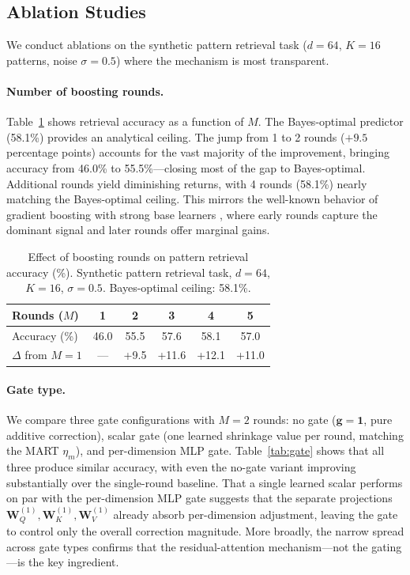 \documentclass{article}
\theoremstyle{definition}
\begin{document}
\subsection{Ablation Studies}
\label{sec:ablations}

We conduct ablations on the synthetic pattern retrieval task ($d = 64$, $K = 16$ patterns, noise $\sigma = 0.5$) where the mechanism is most transparent.

\paragraph{Number of boosting rounds.}
Table~\ref{tab:rounds} shows retrieval accuracy as a function of $M$.
The Bayes-optimal predictor (58.1\%) provides an analytical ceiling.
The jump from 1 to 2 rounds ($+9.5$ percentage points) accounts for the vast majority of the improvement, bringing accuracy from 46.0\% to 55.5\%---closing most of the gap to Bayes-optimal.
Additional rounds yield diminishing returns, with 4 rounds (58.1\%) nearly matching the Bayes-optimal ceiling.
This mirrors the well-known behavior of gradient boosting with strong base learners \citep{friedman2001greedy}, where early rounds capture the dominant signal and later rounds offer marginal gains.

\begin{table}[t]
\centering
\caption{Effect of boosting rounds on pattern retrieval accuracy (\%). Synthetic pattern retrieval task, $d=64$, $K=16$, $\sigma=0.5$. Bayes-optimal ceiling: 58.1\%.}
\label{tab:rounds}
\begin{tabular}{@{}lccccc@{}}
\toprule
\textbf{Rounds ($M$)} & 1 & 2 & 3 & 4 & 5 \\
\midrule
Accuracy (\%) & 46.0 & 55.5 & 57.6 & 58.1 & 57.0 \\
$\Delta$ from $M{=}1$ & --- & +9.5 & +11.6 & +12.1 & +11.0 \\
\bottomrule
\end{tabular}
\end{table}

\paragraph{Gate type.}
We compare three gate configurations with $M{=}2$ rounds: no gate ($\mathbf{g} = \mathbf{1}$, pure additive correction), scalar gate (one learned shrinkage value per round, matching the MART $\eta_m$), and per-dimension MLP gate.
Table~\ref{tab:gate} shows that all three produce similar accuracy, with even the no-gate variant improving substantially over the single-round baseline.
That a single learned scalar performs on par with the per-dimension MLP gate suggests that the separate projections $\mathbf{W}_Q^{(1)}, \mathbf{W}_K^{(1)}, \mathbf{W}_V^{(1)}$ already absorb per-dimension adjustment, leaving the gate to control only the overall correction magnitude.
More broadly, the narrow spread across gate types confirms that the residual-attention mechanism---not the gating---is the key ingredient.
\end{document}
